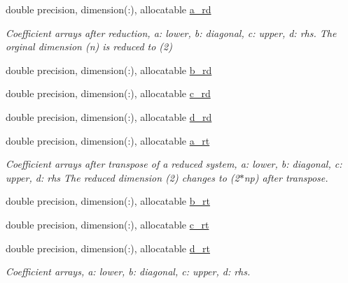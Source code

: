 \textbf{ }\par
\begin{DoxyCompactItemize}
\item 
double precision, dimension(\+:), allocatable \hyperlink{structpascal__tdma_1_1ptdma__plan__single_a732d93dcbef429c1396a6f7ace9cefa6}{a\+\_\+rd}
\begin{DoxyCompactList}\small\item\em Coefficient arrays after reduction, a\+: lower, b\+: diagonal, c\+: upper, d\+: rhs. The orginal dimension (n) is reduced to (2) \end{DoxyCompactList}\item 
double precision, dimension(\+:), allocatable \hyperlink{structpascal__tdma_1_1ptdma__plan__single_acf24e954fa50a47ece2c59598b81c157}{b\+\_\+rd}
\item 
double precision, dimension(\+:), allocatable \hyperlink{structpascal__tdma_1_1ptdma__plan__single_a9450979ebd66ed321f27165c8e13629f}{c\+\_\+rd}
\item 
double precision, dimension(\+:), allocatable \hyperlink{structpascal__tdma_1_1ptdma__plan__single_a8b99edaa7ecd71fe6ceafd9c69d9a374}{d\+\_\+rd}
\end{DoxyCompactItemize}

\textbf{ }\par
\begin{DoxyCompactItemize}
\item 
double precision, dimension(\+:), allocatable \hyperlink{structpascal__tdma_1_1ptdma__plan__single_ad8bed95f594c23d7df9467e204025a74}{a\+\_\+rt}
\begin{DoxyCompactList}\small\item\em Coefficient arrays after transpose of a reduced system, a\+: lower, b\+: diagonal, c\+: upper, d\+: rhs The reduced dimension (2) changes to (2$\ast$np) after transpose. \end{DoxyCompactList}\item 
double precision, dimension(\+:), allocatable \hyperlink{structpascal__tdma_1_1ptdma__plan__single_a8e9487525ccef0d45c8a5440103613b0}{b\+\_\+rt}
\item 
double precision, dimension(\+:), allocatable \hyperlink{structpascal__tdma_1_1ptdma__plan__single_a7169b89281236696ea6eb5631ce44d95}{c\+\_\+rt}
\item 
double precision, dimension(\+:), allocatable \hyperlink{structpascal__tdma_1_1ptdma__plan__single_a627be8624cd48aa5b3aad7f6cf8d0b08}{d\+\_\+rt}
\begin{DoxyCompactList}\small\item\em Coefficient arrays, a\+: lower, b\+: diagonal, c\+: upper, d\+: rhs. \end{DoxyCompactList}\end{DoxyCompactItemize}



